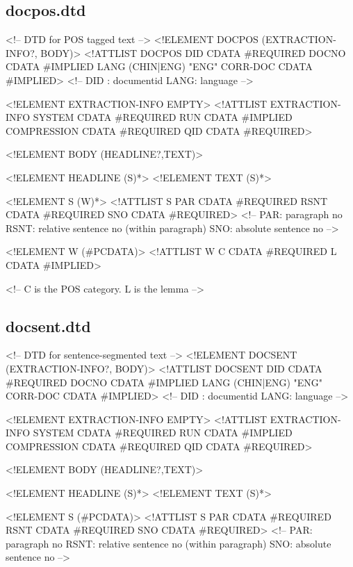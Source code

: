 \documentclass[10pt]{article}
\begin{document}
\subsection{docpos.dtd}
\begin{center}
\begin{boxedverbatim}
<!--  DTD for POS tagged text  -->
<!ELEMENT DOCPOS (EXTRACTION-INFO?, BODY)>
<!ATTLIST DOCPOS
   DID   CDATA      #REQUIRED
   DOCNO CDATA      #IMPLIED
   LANG  (CHIN|ENG) "ENG"
   CORR-DOC CDATA   #IMPLIED>
   <!-- DID : documentid
       LANG: language    -->

<!ELEMENT EXTRACTION-INFO EMPTY>
<!ATTLIST EXTRACTION-INFO
    SYSTEM  CDATA  #REQUIRED
    RUN     CDATA  #IMPLIED
    COMPRESSION CDATA #REQUIRED
    QID     CDATA  #REQUIRED>

<!ELEMENT BODY (HEADLINE?,TEXT)>

<!ELEMENT HEADLINE (S)*>
<!ELEMENT TEXT (S)*>

<!ELEMENT S (W)*>
<!ATTLIST S
    PAR  CDATA #REQUIRED
    RSNT CDATA #REQUIRED
    SNO  CDATA #REQUIRED>
    <!-- PAR: paragraph no
         RSNT: relative sentence no (within paragraph)
         SNO: absolute sentence no -->

<!ELEMENT W (#PCDATA)>
<!ATTLIST W
    C   CDATA #REQUIRED
    L   CDATA #IMPLIED>

<!-- C is the POS category. L is the lemma -->
\end{boxedverbatim}
\end{center}


\subsection{docsent.dtd}
\label{section:docsent-dtd}
\begin{center}
\begin{boxedverbatim}
<!--  DTD for sentence-segmented text  -->
<!ELEMENT DOCSENT (EXTRACTION-INFO?, BODY)>
<!ATTLIST DOCSENT
   DID   CDATA      #REQUIRED
   DOCNO CDATA      #IMPLIED
   LANG  (CHIN|ENG) "ENG"
   CORR-DOC CDATA   #IMPLIED>
   <!-- DID : documentid
       LANG: language    -->

<!ELEMENT EXTRACTION-INFO EMPTY>
<!ATTLIST EXTRACTION-INFO
    SYSTEM  CDATA  #REQUIRED
    RUN     CDATA  #IMPLIED
    COMPRESSION CDATA #REQUIRED
    QID     CDATA  #REQUIRED>

<!ELEMENT BODY (HEADLINE?,TEXT)>

<!ELEMENT HEADLINE (S)*>
<!ELEMENT TEXT (S)*>

<!ELEMENT S (#PCDATA)>
<!ATTLIST S
    PAR  CDATA #REQUIRED
    RSNT CDATA #REQUIRED
    SNO  CDATA #REQUIRED>
    <!-- PAR: paragraph no
         RSNT: relative sentence no (within paragraph)
         SNO: absolute sentence no -->
\end{boxedverbatim}
\end{center}
\end{document}

